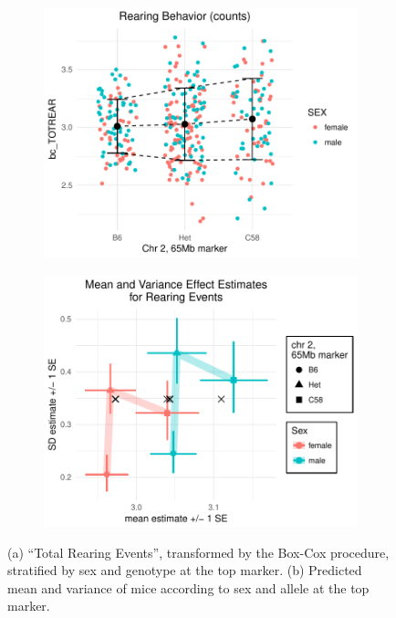     \begin{figure}

        \begin{subfigure}{0.48\textwidth}
            \includegraphics[width=\textwidth]{images/14_Bailey_of_TOTREAR_phen_plot_chr2.pdf}
            \subcaption{\label{fig:bailey_phenotype_plot}}
        \end{subfigure}
        \hfill
        \begin{subfigure}{0.48\textwidth}
            \includegraphics[width=\textwidth]{images/14_Bailey_of_TOTREAR_mean_var_plot_chr2.pdf}
            \subcaption{\label{fig:bailey_mean_var_plot}}
        \end{subfigure}
        \caption{(a) ``Total Rearing Events'', transformed by the Box-Cox procedure, stratified by sex and genotype at the top marker. (b) Predicted mean and variance of mice according to sex and allele at the top marker.}
        \label{fig:bailey_detail}
    \end{figure}

